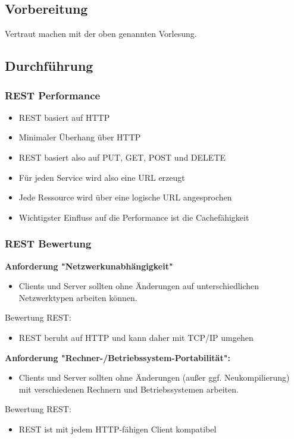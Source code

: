\subsection{Vorbereitung}
Vertraut machen mit der oben genannten Vorlesung.

\subsection{Durchführung}
\subsubsection{REST Performance}
\begin{itemize}
	\item REST basiert auf HTTP
	\item Minimaler Überhang über HTTP
	\item REST basiert also auf PUT, GET, POST und DELETE
	\item Für jeden Service wird also eine URL erzeugt
	\item Jede Ressource wird über eine logische URL angesprochen
	\item Wichtigster Einfluss auf die Performance ist die Cachefähigkeit
\end{itemize}

\subsubsection{REST Bewertung}
\textbf{Anforderung "Netzwerkunabhängigkeit"}
\begin{itemize}
	\item Clients und Server sollten ohne Änderungen auf unterschiedlichen Netzwerktypen arbeiten können.
\end{itemize}
Bewertung REST:
\begin{itemize}
	\item REST beruht auf HTTP und kann daher mit TCP/IP umgehen
\end{itemize}

\textbf{Anforderung "Rechner-/Betriebssystem-Portabilität":}
\begin{itemize}
	\item Clients und Server sollten ohne Änderungen (außer ggf. Neukompilierung) mit verschiedenen Rechnern und Betriebssystemen arbeiten.
\end{itemize}
Bewertung REST:
\begin{itemize}
	\item REST ist mit jedem HTTP-fähigen Client kompatibel
\end{itemize}

